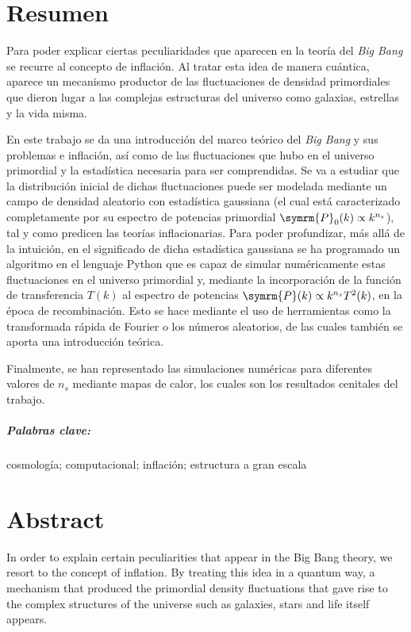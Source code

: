 \chapter*{Resumen}
Para poder explicar ciertas peculiaridades que aparecen en la teoría del \textit{Big Bang} se recurre al concepto de inflación. Al tratar esta idea de manera cuántica, aparece un mecanismo productor de las fluctuaciones de densidad primordiales que dieron lugar a las complejas estructuras del universo como galaxias, estrellas y la vida misma.

En este trabajo se da una introducción del marco teórico del \textit{Big Bang} y sus problemas e inflación, así como de las fluctuaciones que hubo en el universo primordial y la estadística necesaria para ser comprendidas. Se va a estudiar que la distribución inicial de dichas fluctuaciones puede ser modelada mediante un campo de densidad aleatorio con estadística gaussiana (el cual está caracterizado completamente por su espectro de potencias primordial \(\symrm{P}_0(k)\propto k^{n_s}\)), tal y como predicen las teorías inflacionarias. Para poder profundizar, más allá de la intuición, en el significado de dicha estadística gaussiana se ha programado un algoritmo en el lenguaje Python que es capaz de simular numéricamente estas fluctuaciones en el universo primordial y, mediante la incorporación de la función de transferencia \(T(k)\) al espectro de potencias \(\symrm{P}(k)\propto k^{n_s}T^2(k)\), en la época de recombinación. Esto se hace mediante el uso de herramientas como la transformada rápida de Fourier o los números aleatorios, de las cuales también se aporta una introducción teórica.

Finalmente, se han representado las simulaciones numéricas para diferentes valores de \(n_s\) mediante mapas de calor, los cuales son los resultados cenitales del trabajo.
\paragraph{Palabras clave:} cosmología; computacional; inflación; estructura a gran escala
\chapter*{Abstract}
In order to explain certain peculiarities that appear in the Big Bang theory, we resort to the concept of inflation. By treating this idea in a quantum way, a mechanism that produced the primordial density fluctuations that gave rise to the complex structures of the universe such as galaxies, stars and life itself appears.

